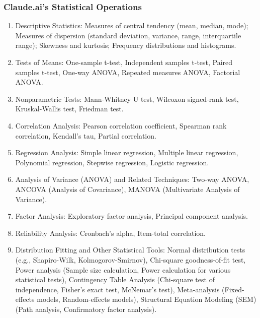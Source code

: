 \documentclass{article}
\begin{document}
\subsubsection{Claude.ai's Statistical Operations}
\begin{enumerate}
    \item Descriptive Statistics: Measures of central tendency (mean, median, mode); Measures of dispersion (standard deviation, variance, range, interquartile range); Skewness and kurtosis; Frequency distributions and histograms.
    \item Tests of Means: One-sample t-test, Independent samples t-test, Paired samples t-test, One-way ANOVA, Repeated measures ANOVA, Factorial ANOVA.
    \item Nonparametric Tests: Mann-Whitney U test, Wilcoxon signed-rank test, Kruskal-Wallis test, Friedman test.
    \item Correlation Analysis: Pearson correlation coefficient, Spearman rank correlation, Kendall's tau, Partial correlation.
    \item Regression Analysis: Simple linear regression, Multiple linear regression, Polynomial regression, Stepwise regression, Logistic regression.
    \item Analysis of Variance (ANOVA) and Related Techniques: Two-way ANOVA, ANCOVA (Analysis of Covariance), MANOVA (Multivariate Analysis of Variance).
    \item Factor Analysis: Exploratory factor analysis, Principal component analysis.
    \item Reliability Analysis: Cronbach's alpha, Item-total correlation.
    \item Distribution Fitting and Other Statistical Tools: Normal distribution tests (e.g., Shapiro-Wilk, Kolmogorov-Smirnov), Chi-square goodness-of-fit test, Power analysis (Sample size calculation, Power calculation for various statistical tests), Contingency Table Analysis (Chi-square test of independence, Fisher's exact test, McNemar's test), Meta-analysis (Fixed-effects models, Random-effects models), Structural Equation Modeling (SEM) (Path analysis, Confirmatory factor analysis).
\end{enumerate}
\end{document}

